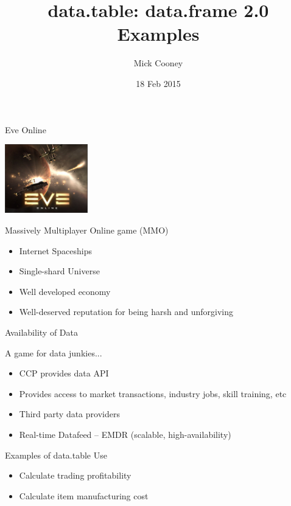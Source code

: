 \documentclass[12pt]{beamer}
\title[data.table: data.frame 2.0 (Examples)]{data.table: data.frame 2.0\\Examples}
\author{Mick Cooney}
\date{18 Feb 2015}
\begin{document}
\begin{frame}
\titlepage
\end{frame}



\begin{frame}[fragile]{Eve Online}

\begin{center}
\includegraphics[height=3cm]{eve_online.jpg}
\end{center}

Massively Multiplayer Online game (MMO)

\begin{itemize}
\item<2-> Internet Spaceships
\item<3-> Single-shard Universe
\item<4-> Well developed economy
\item<5-> Well-deserved reputation for being harsh and unforgiving
\end{itemize}

\end{frame}


\begin{frame}[fragile]{Availability of Data}

A game for data junkies...

\begin{itemize}
\item<2-> CCP provides data API
\item<3-> Provides access to market transactions, industry jobs, skill training, etc
\item<4-> Third party data providers
\item<5-> Real-time Datafeed -- EMDR (scalable, high-availability)
\end{itemize}

\end{frame}


\begin{frame}[fragile]{Examples of data.table Use}

\begin{itemize}
\item<2-> Calculate trading profitability
\item<3-> Calculate item manufacturing cost
\end{itemize}

\end{frame}
\end{document}
